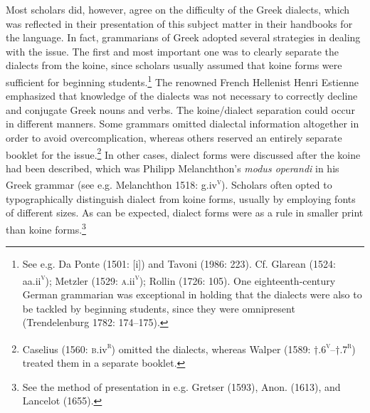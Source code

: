 \documentclass[12pt]{article}
\newenvironment{styleStandard}{\renewcommand\baselinestretch{1.25}\setlength\leftskip{0in}\setlength\rightskip{0in}\setlength\parindent{0.1972in}\setlength\parfillskip{0pt plus 1fil}\setlength\parskip{0in plus 1pt}\writerlistparindent\writerlistleftskip\leavevmode\normalfont\normalsize\writerlistlabel\ignorespaces}{\unskip\vspace{0in plus 1pt}\par}
\newcommand\writerlistleftskip{}
\newcommand\writerlistparindent{}
\newcommand\writerlistlabel{}
\begin{document}
\begin{styleStandard}
Most scholars did, however, agree on the difficulty of the Greek dialects, which was reflected in their presentation of this subject matter in their handbooks for the language. In fact, grammarians of Greek adopted several strategies in dealing with the issue. The first and most important one was to clearly separate the dialects from the koine, since scholars usually assumed that koine forms were sufficient for beginning students.\footnote{ See e.g. Da Ponte (1501: [i]) and Tavoni (1986: 223). Cf. Glarean (1524: aa.ii\textsc{\textsuperscript{v}}); Metzler (1529: \textsc{a}.ii\textsc{\textsuperscript{v}}); Rollin (1726: 105). One eighteenth-century German grammarian was exceptional in holding that the dialects were also to be tackled by beginning students, since they were omnipresent (Trendelenburg 1782: 174–175).} The renowned French Hellenist Henri Estienne emphasized that knowledge of the dialects was not necessary to correctly decline and conjugate Greek nouns and verbs. The koine/dialect separation could occur in different manners. Some grammars omitted dialectal information altogether in order to avoid overcomplication, whereas others reserved an entirely separate booklet for the issue.\footnote{ Caselius (1560: \textsc{b.}iv\textsc{\textsuperscript{r}}) omitted the dialects, whereas Walper (1589: †.6\textsc{\textsuperscript{v}}–†.7\textsc{\textsuperscript{r}}) treated them in a separate booklet.} In other cases, dialect forms were discussed after the koine had been described, which was Philipp Melanchthon’s \textit{modus operandi} in his Greek grammar (see e.g. Melanchthon 1518: g.iv\textsc{\textsuperscript{v}}). Scholars often opted to typographically distinguish dialect from koine forms, usually by employing fonts of different sizes. As can be expected, dialect forms were as a rule in smaller print than koine forms.\footnote{ See the method of presentation in e.g. Gretser (1593), Anon. (1613), and Lancelot (1655).}
\end{styleStandard}
\end{document}
